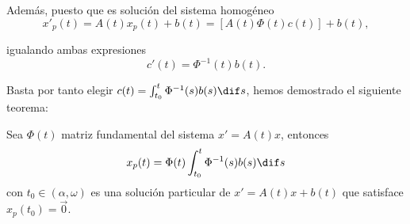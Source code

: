 \documentclass[../main.tex]{subfiles}
\begin{document}
Además, puesto que es solución del sistema homogéneo
\[x'_p(t) = A(t)x_p(t) + b(t) = [A(t) \Phi(t) c(t)] + b(t),\]

igualando ambas expresiones
\[c'(t) = \Phi^{-1}(t) b(t).\]

Basta por tanto elegir \(c(t) = \int_{t_0}^t \Phi^{-1}(s) b(s) \dif s\), hemos
demostrado el siguiente teorema:

\begin{theorem}
	Sea \(\Phi(t)\) matriz fundamental del sistema \(x' = A(t)x\), entonces 
	\[x_p(t) = \Phi(t) \int_{t_0}^t \Phi^{-1}(s) b(s) \dif s\]
	con \(t_0 \in (\alpha, \omega)\) es una solución particular de 
	\(x' = A(t)x + b(t)\) que satisface \(x_p(t_0) = \vec{0}\).
\end{theorem}
\end{document}

